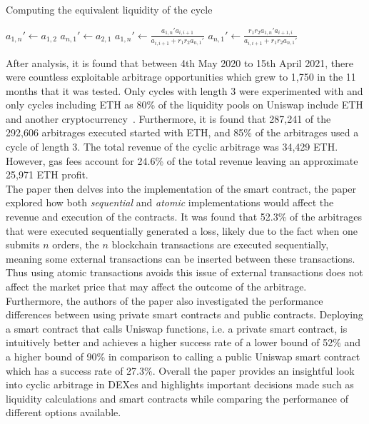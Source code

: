 \begin{algorithm}
    \caption{Computing the equivalent liquidity of the cycle}\label{alg:liquidity_alg}
    \begin{algorithmic}
        \State $a_{1, n}' \leftarrow a_{1,2}$
        \State $a_{n, 1}' \leftarrow a_{2,1}$
        \State $a_{1, n}' \leftarrow \frac{a_{1,n}'a_{i,i+1}}{a_{i,i+1}+r_1 r_2 a_{n,1}'}$
        \State $a_{n, 1}' \leftarrow \frac{r_1 r_2 a_{1,n}'a_{i+1, i}}{a_{i,i+1}+r_1 r_2 a_{n,1}'}$
        \EndFor
    \end{algorithmic}
\end{algorithm}
\vspace{5mm}
\noindent After analysis, it is found that between 4th May 2020 to 15th April 2021, there were countless exploitable arbitrage opportunities which grew to 1,750 in the 11 months that it was tested. Only cycles with length 3 were experimented with and only cycles including ETH as 80\% of the liquidity pools on Uniswap include ETH and another cryptocurrency~\cite{heimbach2021behavior}. Furthermore, it is found that 287,241 of the 292,606 arbitrages executed started with ETH, and 85\% of the arbitrages used a cycle of length 3. The total revenue of the cyclic arbitrage was 34,429 ETH. However, gas fees account for 24.6\% of the total revenue leaving an approximate 25,971 ETH profit.
\\[5mm]
The paper then delves into the implementation of the smart contract, the paper explored how both \textit{sequential} and \textit{atomic} implementations would affect the revenue and execution of the contracts. It was found that 52.3\% of the arbitrages that were executed sequentially generated a loss, likely due to the fact when one submits $n$ orders, the $n$ blockchain transactions are executed sequentially, meaning some external transactions can be inserted between these transactions. Thus using atomic transactions avoids this issue of external transactions does not affect the market price that may affect the outcome of the arbitrage.
\\[5mm]
Furthermore, the authors of the paper also investigated the performance differences between using private smart contracts and public contracts. Deploying a smart contract that calls Uniswap functions, i.e. a private smart contract, is intuitively better and achieves a higher success rate of a lower bound of 52\% and a higher bound of 90\% in comparison to calling a public Uniswap smart contract which has a success rate of 27.3\%. Overall the paper provides an insightful look into cyclic arbitrage in DEXes and highlights important decisions made such as liquidity calculations and smart contracts while comparing the performance of different options available.

